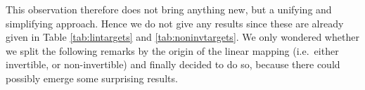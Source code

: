 This observation therefore does not bring anything new, but a unifying and simplifying approach. Hence we do not give any results since these are already given in Table \ref{tab:lintargets} and \ref{tab:noninvtargets}. We only wondered whether we split the following remarks by the origin of the linear mapping (i.e.\ either invertible, or non-invertible) and finally decided to do so, because there could possibly emerge some surprising results.


